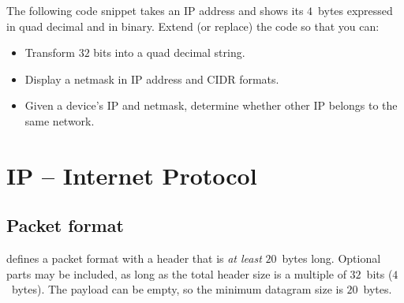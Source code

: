 \begin{exercise}
The following code snippet takes an IP address and shows its $4$~bytes expressed in 
quad decimal and in binary.
Extend (or replace) the code so that you can:
\begin{itemize}
\item Transform $32$ bits into a quad decimal string.
\item Display a netmask in IP address and CIDR formats.
\item Given a device's IP and netmask, determine whether other IP belongs to the same network.
\end{itemize}
\begin{center}
\end{center}
\end{exercise}




% 







\section{IP -- Internet Protocol}\label{sec:layer3:ip}

\subsection{Packet format}\label{sec:layer3:ip:format}

 defines a packet format with a header 
that is \textit{at least} $20$~bytes long. Optional parts may be included,
as long as the total header size is a multiple of $32$~bits ($4$~bytes).
The payload can be empty, so the minimum datagram size is $20$~bytes.\\

